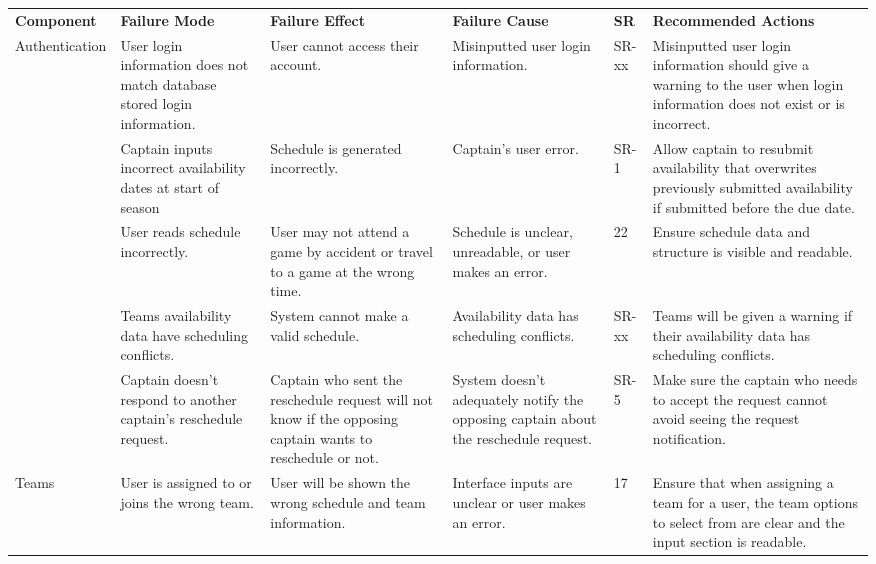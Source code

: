 \documentclass{article}
\begin{document}
\begin{landscape}
\vspace*{-3.25cm}
\hspace*{-3.25cm}
\def\arraystretch{1.3}
\begin{tabularx}{504pt}{|p{3cm}||p{4cm}|p{4cm}|p{4cm}|p{1cm}|p{5.75cm}|}
\cline{1-6}
\textbf{Component} & \textbf{Failure Mode} & \textbf{Failure Effect} & \textbf{Failure Cause} & \textbf{SR} & \textbf{Recommended Actions}\\
\cline{1-6}
\multirow{2}{2cm}{Authentication} & User login information does not match database stored
login information. & User cannot access their account. & Misinputted user login information.
& SR-xx & Misinputted user login information should give a warning to the user when
login information does not exist or is incorrect.\\
\cline{1-6}
\multirow{2}{2cm}{Scheduling} & Captain inputs incorrect availability dates at
start of season & Schedule is generated incorrectly. & Captain's user error. &
SR-1 & Allow captain to resubmit availability that overwrites previously
submitted availability if submitted before the due date.\\
\cline{2-6}
& User reads schedule incorrectly. & User may not attend a game by accident or
travel to a game at the wrong time. & Schedule is unclear, unreadable, or user
makes an error. & 22 & Ensure schedule data and structure is visible and
readable.\\
\cline{2-6}
& Teams availability data have scheduling conflicts. & System cannot make a
valid schedule. & Availability data has scheduling conflicts. & SR-xx & Teams
will be given a warning if their availability data has scheduling conflicts.\\
\cline{2-6}
& Captain doesn't respond to another captain's reschedule request. & Captain
who sent the reschedule request will not know if the opposing captain wants to
reschedule or not. & System doesn't adequately notify the opposing captain
about the reschedule request. & SR-5 & Make sure the captain who needs to
accept the request cannot avoid seeing the request notification.\\
\cline{1-6}
\multirow{2}{2cm}{Teams} & User is assigned to or joins the wrong team. & User
will be shown the wrong schedule and team information. & Interface inputs are
unclear or user makes an error. & 17 & Ensure that when assigning a team for a
user, the team options to select from are clear and the input section is
readable.\\

\end{tabularx}
\end{landscape}
\end{document}

